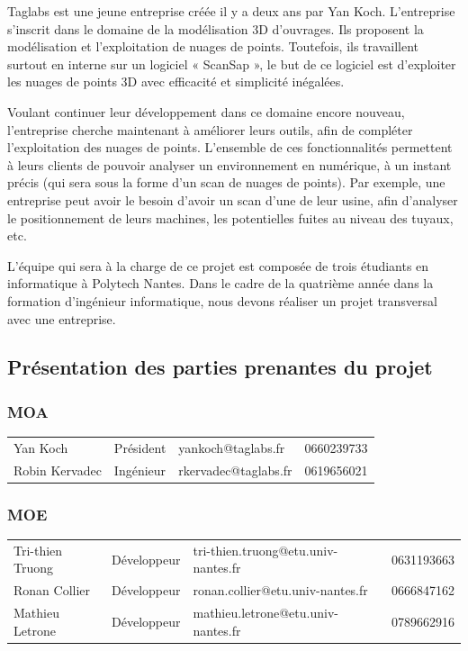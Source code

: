 \documentclass[12pt,titlepage,french]{article}
\begin{document}
Taglabs est une jeune entreprise créée il y a deux ans par Yan Koch. L’entreprise s’inscrit dans le domaine de la modélisation 3D d’ouvrages. Ils proposent la modélisation et l’exploitation de nuages de points. Toutefois, ils travaillent surtout en interne sur un logiciel « ScanSap », le but de ce logiciel est d’exploiter les nuages de points 3D avec efficacité et simplicité inégalées.

Voulant continuer leur développement dans ce domaine encore nouveau, l'entreprise cherche maintenant à améliorer leurs outils, afin de compléter l'exploitation des nuages de points. L'ensemble de ces fonctionnalités permettent à leurs clients de pouvoir analyser un environnement en numérique, à un instant précis (qui sera sous la forme d'un scan de nuages de points). Par exemple, une entreprise peut avoir le besoin d'avoir un scan d'une de leur usine, afin d'analyser le positionnement de leurs machines, les potentielles fuites au niveau des tuyaux, etc.

L'équipe qui sera à la charge de ce projet est composée de trois étudiants en informatique à Polytech Nantes. Dans le cadre de la quatrième année dans la formation d'ingénieur informatique, nous devons réaliser un projet transversal avec une entreprise.

\subsection*{Présentation des parties prenantes du projet}

\subsubsection*{MOA}

\noindent\begin{tabu} to \textwidth {X[c]X[c]X[c]X[c]}\toprule
   &&        &\\\toprule
      Yan Koch&   Président&  yankoch@taglabs.fr&    0660239733\\\midrule
Robin Kervadec&   Ingénieur&rkervadec@taglabs.fr&    0619656021\\\bottomrule
\end{tabu}

\subsubsection*{MOE}

\noindent\begin{tabu} to \textwidth {X[c2]X[c]X[c3]X[c]}\toprule
     &&                       &\\\toprule
Tri-thien Truong& Développeur&tri-thien.truong@etu.univ-nantes.fr&    0631193663\\\midrule
   Ronan Collier& Développeur&   ronan.collier@etu.univ-nantes.fr&    0666847162\\\midrule
 Mathieu Letrone& Développeur& mathieu.letrone@etu.univ-nantes.fr&    0789662916\\\bottomrule
\end{tabu}
\end{document}
